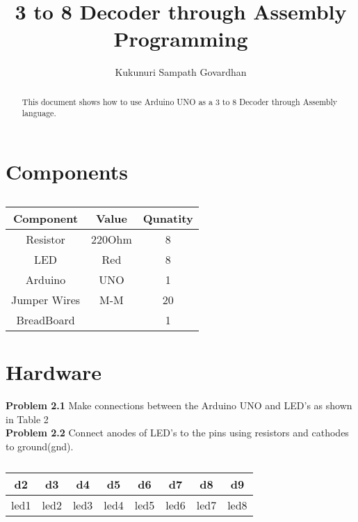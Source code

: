 \documentclass[journal,12pt,twocolumn]{IEEEtran}
\title{
3 to 8 Decoder through Assembly Programming
}
\author{Kukunuri Sampath Govardhan}
\begin{document}
\maketitle
\tableofcontents
\begin{abstract}
This document shows how to use Arduino UNO as a 3 to 8 Decoder through Assembly language.
\end{abstract}
\section{Components}
\begin{table}[h]
    \centering
    \begin{tabular}{| c | c | c |}
       \hline
       \textbf{Component}  &  \textbf{Value}  &  \textbf{Qunatity}\\
       \hline
         Resistor  &  220Ohm  &  8  \\
         \hline
         LED  &  Red  &  8  \\
         \hline
         Arduino  & UNO & 1  \\
         \hline
         Jumper Wires  &  M-M  &  20  \\
         \hline
         BreadBoard  &    &  1\\
         \hline
         
    \end{tabular}
    \caption{}
    \label{tab:my_label}
\end{table}
\section{Hardware}
\textbf{Problem 2.1} Make connections between the Arduino UNO and LED's as shown in Table 2 \\

\textbf{Problem 2.2} Connect anodes of LED's to the pins using resistors and cathodes to ground(gnd).\\
\begin{table}[h]
    \centering
    \begin{tabular}{| c | c | c | c | c | c | c | c |}
        \hline
         d2 & d3 & d4 & d5 & d6 & d7 & d8 & d9   \\
       \hline
       led1 & led2 & led3 & led4 & led5 & led6 & led7 & led8  \\
         \hline
    \end{tabular}
    \caption{}
    \label{tab:my_label}
\end{table}
\end{document}
